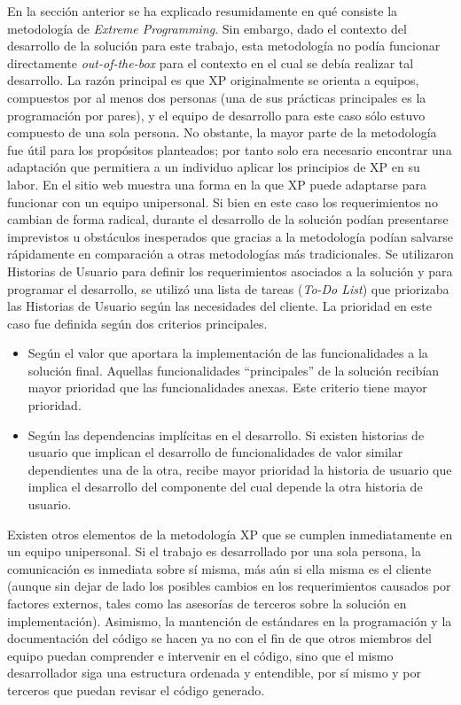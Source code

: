 En la sección anterior se ha explicado resumidamente en qué consiste la metodología de \textit{Extreme Programming}. Sin embargo, dado el contexto del desarrollo de la solución para este trabajo, esta metodología no podía funcionar directamente \textit{out-of-the-box} para el contexto en el cual se debía realizar tal desarrollo. La razón principal es que XP originalmente se orienta a equipos, compuestos por al menos dos personas (una de sus prácticas principales es la programación por pares), y el equipo de desarrollo para este caso sólo estuvo compuesto de una sola persona. No obstante, la mayor parte de la metodología fue útil para los propósitos planteados; por tanto solo era necesario encontrar una adaptación que permitiera a un individuo aplicar los principios de XP en su labor.
	En el sitio web \cite{xpforone2006} muestra una forma en la que XP puede adaptarse para funcionar con un equipo unipersonal. Si bien en este caso los requerimientos no cambian de forma radical, durante el desarrollo de la solución podían presentarse imprevistos u obstáculos inesperados que gracias a la metodología podían salvarse rápidamente en comparación a otras metodologías más tradicionales. Se utilizaron Historias de Usuario para definir los requerimientos asociados a la solución y para programar el desarrollo, se utilizó una lista de tareas (\textit{To-Do List}) que priorizaba las Historias de Usuario según las necesidades del cliente. La prioridad en este caso fue definida según dos criterios principales.
\begin{itemize}
\item Según el valor que aportara la implementación de las funcionalidades a la solución final. Aquellas funcionalidades “principales” de la solución recibían mayor prioridad que las funcionalidades anexas. Este criterio tiene mayor prioridad.
\item Según las dependencias implícitas en el desarrollo. Si existen historias de usuario que implican el desarrollo de funcionalidades de valor similar dependientes una de la otra, recibe mayor prioridad la historia de usuario que implica el desarrollo del componente del cual depende la otra historia de usuario.
\end{itemize}
	
Existen otros elementos de la metodología XP que se cumplen inmediatamente en un equipo unipersonal. Si el trabajo es desarrollado por una sola persona, la comunicación es inmediata sobre sí misma, más aún si ella misma es el cliente (aunque sin dejar de lado los posibles cambios en los requerimientos causados por factores externos, tales como las asesorías de terceros sobre la solución en implementación). Asimismo, la mantención de estándares en la programación y la documentación del código se hacen ya no con el fin de que otros miembros del equipo puedan comprender e intervenir en el código, sino que el mismo desarrollador siga una estructura ordenada y entendible, por sí mismo y por terceros que puedan revisar el código generado.


